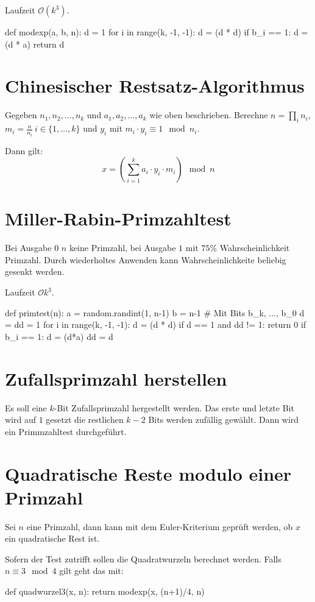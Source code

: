 Laufzeit $\mathcal{O}(k^3)$.

\begin{python}
def modexp(a, b, n):
    d = 1
    for i in range(k, -1, -1):
        d = (d * d) %
        if b_i == 1:
            d = (d * a) %
    return d
\end{python}

\section{Chinesischer Restsatz-Algorithmus}
Gegeben $n_1, n_2, \ldots, n_k$ und $a_1, a_2, \ldots, a_k$ wie oben beschrieben.
Berechne $n = \prod_i n_i$, $m_i = \frac{n}{n_i}\ i \in \{1, \ldots, k\}$ und
$y_i$ mit $m_i \cdot y_i \equiv 1 \mod n_i$.

Dann gilt:
\begin{equation}
    x = \left( \sum_{i=1}^k a_i \cdot y_i \cdot m_i \right) \mod n
\end{equation}

\section{Miller-Rabin-Primzahltest}
Bei Ausgabe 0 $n$ keine Primzahl, bei Ausgabe $1$ mit $75\%$ Wahrscheinlichkeit Primzahl.
Durch wiederholtes Anwenden kann Wahrscheinlichkeite beliebig gesenkt werden.

Laufzeit $\mathcal{O}{k^3}$.

\begin{python}
def primtest(n):
    a = random.randint(1, n-1)
    b = n-1 # Mit Bits b_k, ..., b_0
    d = dd = 1
    for i in range(k, -1, -1):
        d = (d * d) %
        if d == 1 and dd != 1:
            return 0
        if b_i == 1:
            d = (d*a) %
        dd = d
\end{python}

\section{Zufallsprimzahl herstellen}
Es soll eine $k$-Bit Zufallsprimzahl hergestellt werden. Das erste und letzte Bit wird
auf $1$ gesetzt  die restlichen $k-2$ Bits werden zufällig gewählt.
Dann wird ein Primmzahltest durchgeführt.

\section{Quadratische Reste modulo einer Primzahl}
Sei $n$ eine Primzahl, dann kann mit dem Euler-Kriterium geprüft werden, ob $x$ ein
quadratische Rest ist.

Sofern der Test zutrifft sollen die Quadratwurzeln berechnet werden. Falls
$n \equiv 3 \mod 4$ gilt geht das mit:
\begin{python}
def quadwurzel3(x, n):
    return modexp(x, (n+1)/4, n)
\end{python}
